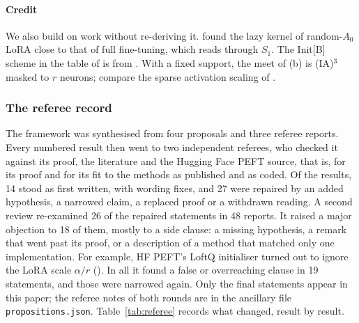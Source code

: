 \paragraph{Credit}
We also build on work without re-deriving it. \citet{malladi2022kernel} found the lazy kernel of random-$A_0$ LoRA close
to that of full fine-tuning, which  reads through $S_1$. The Init[B] scheme in the table of
 is from \citet{hayou2024impact}. With a fixed support, the meet of (b)
is (IA)$^3$ masked to $r$ neurons; compare the sparse activation scaling of \citet{xstoehr2024activation}.

\subsubsection{The referee record}\label{sec:analogy-referee}

The framework was synthesised from four proposals and three referee reports. Every numbered result then went to two
independent referees, who checked it against its proof, the literature and the Hugging Face PEFT source, that is, for
its proof and for its fit to the methods as published and as coded. Of the \nPropositions{} results, 14 stood as first
written, with wording fixes, and 27 were repaired by an added hypothesis, a narrowed claim, a replaced proof or a
withdrawn reading. A second review re-examined 26 of the repaired statements in 48 reports. It raised a major objection
to 18 of them, mostly to a side clause: a missing hypothesis, a remark that went past its proof, or a description of a
method that matched only one implementation. For example, HF PEFT's LoftQ initialiser turned out to ignore the LoRA
scale $\alpha/r$ (). In all it found a false or overreaching clause in 19 statements, and those
were narrowed again. Only the final statements appear in this paper; the referee notes of both rounds are in the
ancillary file \texttt{propositions.json}. Table~\ref{tab:referee} records what changed, result by result.


